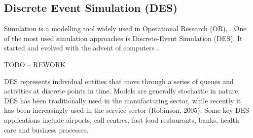 \subsection{Discrete Event Simulation (DES)}
Simulation is a modelling tool widely used in Operational Research (OR), \cite{pidd2005computer}. One of the most used simulation approaches is Discrete-Event Simulation (DES). It started and evolved with the advent of computers \cite{robinson2005}.


TODO -- REWORK






 DES represents individual entities that move through a series of queues and activities at discrete points in time. Models are generally stochastic in nature. DES has been traditionally used in the manufacturing sector, while recently it has been increasingly used in the service sector (Robinson, 2005). Some key DES applications include airports, call centres, fast food restaurants, banks, health care and business processes.






